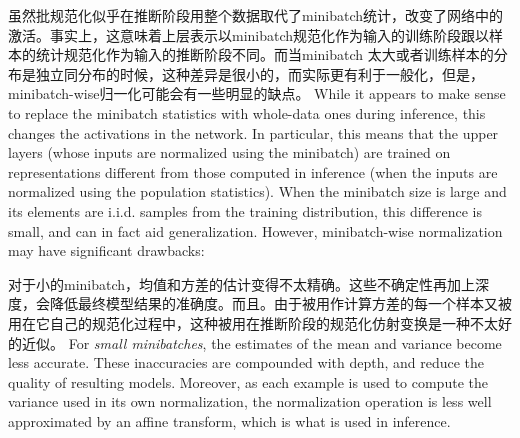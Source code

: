 虽然批规范化似乎在推断阶段用整个数据取代了minibatch统计，改变了网络中的激活。事实上，这意味着上层表示以minibatch规范化作为输入的训练阶段跟以样本的统计规范化作为输入的推断阶段不同。而当minibatch 太大或者训练样本的分布是独立同分布的时候，这种差异是很小的，而实际更有利于一般化，但是，minibatch-wise归一化可能会有一些明显的缺点。
While it appears to make sense to replace the minibatch statistics with whole-data ones during inference, this changes the activations in the network. In particular, this means that the upper layers (whose inputs are normalized using the minibatch) are trained on representations different from those computed in inference (when the inputs are normalized using the population statistics). When the minibatch size is large and its elements are i.i.d. samples from the training distribution, this difference is small, and can in fact aid generalization. However,  minibatch-wise normalization may have significant drawbacks:

对于小的minibatch，均值和方差的估计变得不太精确。这些不确定性再加上深度，会降低最终模型结果的准确度。而且。由于被用作计算方差的每一个样本又被用在它自己的规范化过程中，这种被用在推断阶段的规范化仿射变换是一种不太好的近似。
For {\em small minibatches}, the estimates of the mean and variance become less accurate. These inaccuracies are compounded with depth, and reduce the quality of resulting models. Moreover, as each example is used to compute the variance used in its own normalization, the normalization operation is less well approximated by an affine transform, which is what is used in inference.

